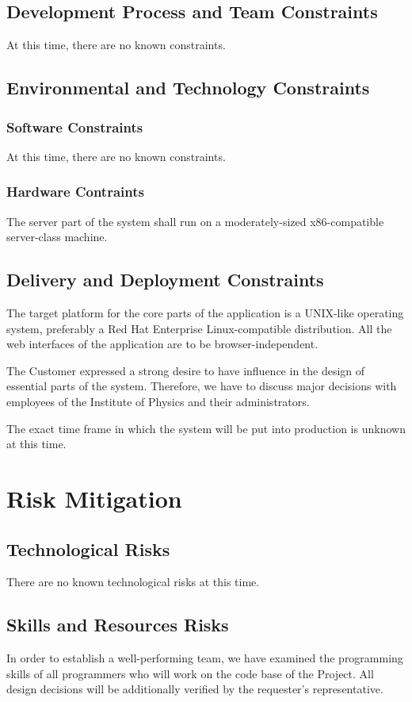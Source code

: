 \documentclass[12pt]{article}
\begin{document}
\subsection{Development Process and Team Constraints}
At this time, there are no known constraints.

\subsection{Environmental and Technology Constraints}

\subsubsection{Software Constraints}
At this time, there are no known constraints.

\subsubsection{Hardware Contraints}
The server part of the system shall run on a moderately-sized x86-compatible
server-class machine.

\subsection{Delivery and Deployment Constraints}
The target platform for the core parts of the application is a UNIX-like
operating system, preferably a Red Hat Enterprise Linux-compatible distribution.
All the web interfaces of the application are to be browser-independent.

The Customer expressed a strong desire to have influence in the design of
essential parts of the system.   Therefore, we have to discuss major decisions
with employees of the Institute of Physics and their administrators.

The exact time frame in which the system will be put into production is unknown
at this time.

\section{Risk Mitigation}

\subsection{Technological Risks}
There are no known technological risks at this time.

\subsection{Skills and Resources Risks}
In order to establish a well-performing team, we have examined the programming
skills of all programmers who will work on the code base of the Project.  All
design decisions will be additionally verified by the requester's
representative.
\end{document}
